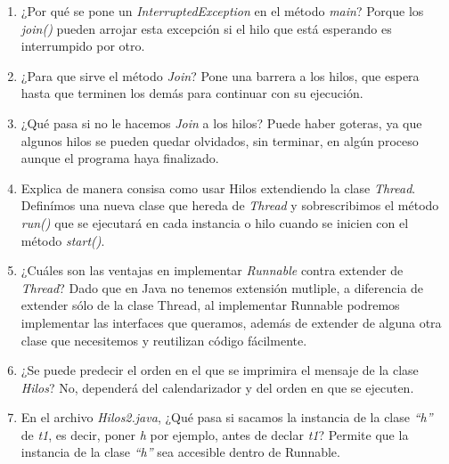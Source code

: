 \documentclass[12pt]{extarticle} %
\begin{document}
\begin{enumerate}
    \item ¿Por qué se pone un \textit{InterruptedException} en el método \textit{main}?
    Porque los \textit{join()} pueden arrojar esta excepción si el hilo que está esperando es interrumpido por otro.
    
    \item ¿Para que sirve el método \textit{Join}?
    Pone una barrera a los hilos, que espera hasta que terminen los demás para continuar con su ejecución.
    
    \item ¿Qué pasa si no le hacemos \textit{Join} a los hilos?
    Puede haber goteras, ya que algunos hilos se pueden quedar olvidados, sin terminar, en algún proceso aunque el programa haya finalizado.
    
    \item Explica de manera consisa como usar Hilos extendiendo la clase \textit{Thread}.
    Definímos una nueva clase que hereda de \textit{Thread} y sobrescribimos el método \textit{run()} que se ejecutará en cada instancia o hilo cuando se inicien con el método \textit{start()}.
    
    \item ¿Cuáles son las ventajas en implementar \textit{Runnable} contra extender de \textit{Thread}? 
    Dado que en Java no tenemos extensión mutliple, a diferencia de extender sólo de la clase Thread, al implementar Runnable podremos implementar las interfaces que queramos, además de extender de alguna otra clase que necesitemos y reutilizan código fácilmente.
    
    \item ¿Se puede predecir el orden en el que se imprimira el mensaje de la clase \textit{Hilos}? 
    No, dependerá del calendarizador y del orden en que se ejecuten.
    
    \item En el archivo \textit{Hilos2.java}, ¿Qué pasa si sacamos la instancia de la clase \textit{“h”} de \textit{t1}, es decir, poner \textit{h} por ejemplo, antes de declar \textit{t1}?
    Permite que la instancia de la clase \textit{“h”} sea accesible dentro de Runnable.
    

\end{enumerate}
\end{document}
